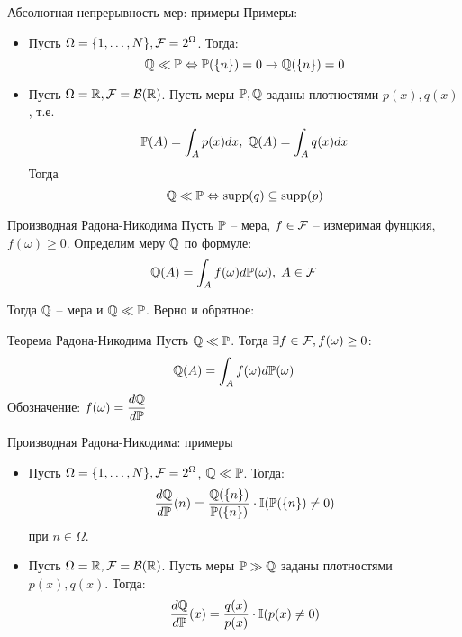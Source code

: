 \documentclass[aspectratio=169]{beamer}
\begin{document}
\begin{frame}{Абсолютная непрерывность мер: примеры}
    Примеры:    
    \begin{itemize}
            \item Пусть $\Omega = \{1, \ldots, N\}, \mathcal{F}=2^{\Omega}$. Тогда:
                $$
                    \mathbb{Q} \ll \mathbb{P} \Leftrightarrow \mathbb{P}(\{n\}) = 0 \to \mathbb{Q}(\{n\}) = 0
                $$
        \end{itemize}
        \pause
        \begin{itemize}
        \item Пусть $\Omega=\mathbb{R}, \mathcal{F} = \mathcal{B}(\mathbb{R})$. Пусть меры $\mathbb{P}, \mathbb{Q}$ заданы плотностями $p(x), q(x)$, т.е.
        $$
            \mathbb{P}(A) = \int_A p(x) dx, \; \mathbb{Q}(A) = \int_A q(x) dx
        $$
        Тогда
        $$
            \mathbb{Q} \ll \mathbb{P} \Leftrightarrow \mathrm{supp}(q) \subseteq\mathrm{supp}(p)
        $$
        \end{itemize}
\end{frame}

\begin{frame}{Производная Радона-Никодима}
    Пусть $\mathbb{P}$ -- мера, $f \in \mathcal{F}$ -- измеримая фунцкия, $f(\omega)\geq 0$. Определим меру $\mathbb{Q}$ по формуле:
    $$
        \mathbb{Q}(A) = \int_A f(\omega) d\mathbb{P}(\omega), \; A \in \mathcal{F}
    $$
    
    Тогда $\mathbb{Q}$ -- мера и $\mathbb{Q} \ll \mathbb{P}$. 
    \pause 
    Верно и обратное:
    \begin{block}{Теорема Радона-Никодима}
        Пусть $\mathbb{Q} \ll \mathbb{P}$. Тогда $\exists f \in \mathcal{F}, f(\omega) \geq 0$:
        $$
            \mathbb{Q}(A) = \int_A f(\omega) d\mathbb{P}(\omega)
        $$Обозначение: $f(\omega) = \dfrac{d\mathbb{Q}}{d\mathbb{P}}$
    \end{block}
\end{frame}

\begin{frame}{Производная Радона-Никодима: примеры}
    \begin{itemize}
        \item Пусть $\Omega = \{1, \ldots, N\}, \mathcal{F}=2^{\Omega}$, $\mathbb{Q} \ll \mathbb{P}$.
        Тогда:
            $$
                \dfrac{d\mathbb{Q}}{d\mathbb{P}}(n) = \dfrac{\mathbb{Q}(\{n\})}{\mathbb{P}(\{n\})} \cdot \mathbb{I}(\mathbb{P}(\{n\}) \neq 0)
            $$при $n \in \Omega$.
        \pause
        \item Пусть $\Omega=\mathbb{R}, \mathcal{F} = \mathcal{B}(\mathbb{R})$. Пусть меры $\mathbb{P} \gg \mathbb{Q}$ заданы плотностями $p(x), q(x)$. 
        Тогда:
            $$
                \dfrac{d\mathbb{Q}}{d\mathbb{P}}(x) = \dfrac{q(x)}{p(x)} \cdot \mathbb{I}(p(x) \neq 0)
            $$
    \end{itemize}
\end{frame}
\end{document}
